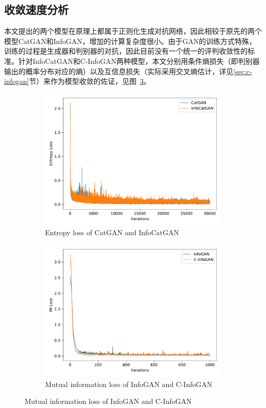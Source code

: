 \subsection{收敛速度分析}
本文提出的两个模型在原理上都属于正则化生成对抗网络，因此相较于原先的两个模型CatGAN和InfoGAN，增加的计算复杂度很小。由于GAN的训练方式特殊，训练的过程是生成器和判别器的对抗，因此目前没有一个统一的评判收敛性的标准。针对InfoCatGAN和C-InfoGAN两种模型，本文分别用条件熵损失（即判别器输出的概率分布对应的熵）以及互信息损失（实际采用交叉熵估计，详见\ref{sec:c-infogan}节）来作为模型收敛的佐证，见图~\ref{fig:convergence}。
\begin{figure}[htbp]
  \centering
  \begin{subfigure}[b]{\twof\textwidth}
    \includegraphics[width=\textwidth]{Img/icg-convergence.pdf}
    \caption{Entropy loss of CatGAN and InfoCatGAN}
    \label{ffig:icg-convergence}
  \end{subfigure}
  \begin{subfigure}[b]{\twof\textwidth}
    \includegraphics[width=\textwidth]{Img/cig-convergence.pdf}
    \caption{Mutual information loss of InfoGAN and C-InfoGAN}
    \label{ffig:cig-convergence}
  \end{subfigure}
  \label{fig:convergence}
\end{figure}

